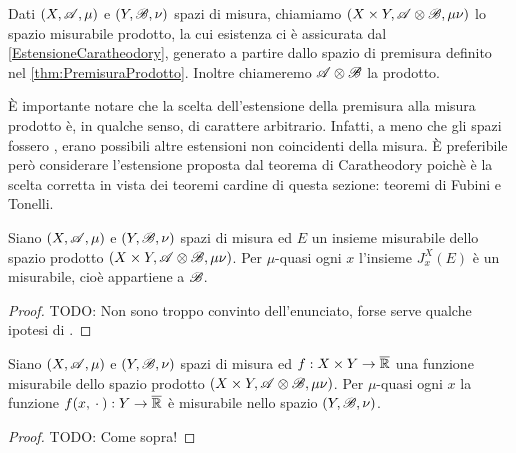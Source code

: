 
\begin{definition}
	Dati $(X,\mathscr A,\mu)$ e $(Y,\mathscr B,\nu)$ spazi di misura, chiamiamo $(X\times Y,\mathscr A\otimes\mathscr B,\mu\nu)$ lo spazio misurabile prodotto, la cui esistenza ci è assicurata dal \cref{EstensioneCaratheodory}, generato a partire dallo spazio di premisura definito nel \cref{thm:PremisuraProdotto}. Inoltre chiameremo $\mathscr A\otimes\mathscr B$ la \sigalg{} prodotto.
\end{definition}

È importante notare che la scelta dell'estensione della premisura alla misura prodotto è, in qualche senso, di carattere arbitrario. Infatti, a meno che gli spazi fossero \sigfin[i], erano possibili altre estensioni non coincidenti della misura. 
È preferibile però considerare l'estensione proposta dal teorema di Caratheodory poichè è la scelta corretta in vista dei teoremi cardine di questa sezione: teoremi di Fubini e Tonelli.

\begin{proposition}
	Siano $(X,\mathscr A,\mu)$ e $(Y,\mathscr B,\nu)$ spazi di misura ed $E$ un insieme misurabile dello spazio prodotto $(X\times Y,\mathscr A\otimes\mathscr B,\mu\nu)$.
	Per $\mu$-quasi ogni $x$ l'insieme $J^X_x(E)$ è un misurabile, cioè appartiene a $\mathscr B$.
\end{proposition}
\begin{proof}
	TODO: Non sono troppo convinto dell'enunciato, forse serve qualche ipotesi di \sigfin[ezza].
\end{proof}

\begin{proposition}
	Siano $(X,\mathscr A,\mu)$ e $(Y,\mathscr B,\nu)$ spazi di misura ed $f:X\times Y\to\overline{\mathbb R}$ una funzione misurabile dello spazio prodotto $(X\times Y,\mathscr A\otimes\mathscr B,\mu\nu)$.
	Per $\mu$-quasi ogni $x$ la funzione $f(x,{}\cdot{}):Y\to\overline{\mathbb R}$ è misurabile nello spazio $(Y,\mathscr B,\nu)$.
\end{proposition}
\begin{proof}
	TODO: Come sopra!
\end{proof}





